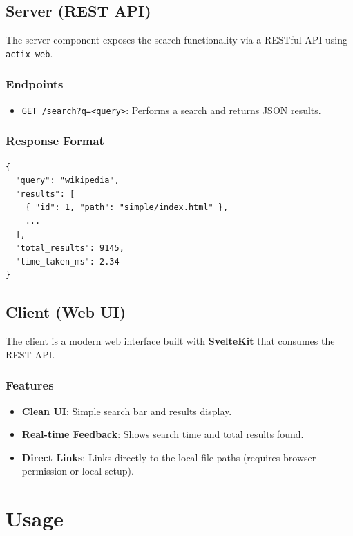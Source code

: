 \documentclass[11pt, a4paper]{article}
\begin{document}
\subsection{Server (REST API)}
The server component exposes the search functionality via a RESTful API using \texttt{actix-web}.

\subsubsection*{Endpoints}
\begin{itemize}
    \item \texttt{GET /search?q=<query>}: Performs a search and returns JSON results.
\end{itemize}

\subsubsection*{Response Format}
\begin{verbatim}
{
  "query": "wikipedia",
  "results": [
    { "id": 1, "path": "simple/index.html" },
    ...
  ],
  "total_results": 9145,
  "time_taken_ms": 2.34
}
\end{verbatim}

\subsection{Client (Web UI)}
The client is a modern web interface built with \textbf{SvelteKit} that consumes the REST API.

\subsubsection*{Features}
\begin{itemize}
    \item \textbf{Clean UI}: Simple search bar and results display.
    \item \textbf{Real-time Feedback}: Shows search time and total results found.
    \item \textbf{Direct Links}: Links directly to the local file paths (requires browser permission or local setup).
\end{itemize}

\section{Usage}
\end{document}
